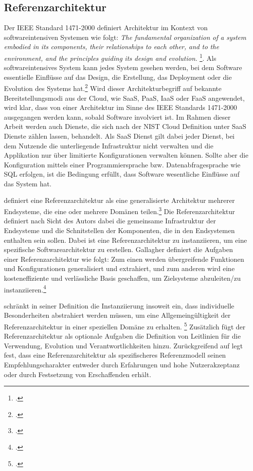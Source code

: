 \subsection{Referenzarchitektur}\label{subsection:Referenzarchitektu}
Der IEEE Standard 1471-2000 definiert Architektur im Kontext von softwareintensiven Systemen wie folgt:
\textit{The fundamental organization of a system embodied in its components, their relationships
to each other, and to the environment, and the principles guiding its design and evolution.} \footcite[][3]{IEEEComputerSociety.2000}. Als softwareintensives System kann jedes System gesehen werden, bei dem Software essentielle Einflüsse auf das Design, die Erstellung, das Deployment oder die Evolution des Systems hat.\footcite[Vgl.][1]{IEEEComputerSociety.2000}
Wird dieser Architekturbegriff auf bekannte Bereitstellungsmodi aus der Cloud, wie \ac{SaaS}, \ac{PaaS}, \ac{IaaS} oder \ac{FaaS} angewendet, wird klar, dass von einer Architektur im Sinne des IEEE Standards 1471-2000 ausgegangen werden kann, sobald Software involviert ist. Im Rahmen dieser Arbeit werden auch Dienste, die sich nach der NIST Cloud Definition unter \ac{SaaS} Dienste zählen lassen, behandelt. Als \ac{SaaS} Dienst gilt dabei jeder Dienst, bei dem Nutzende die unterliegende Infrastruktur nicht verwalten und die Applikation nur über limitierte Konfigurationen verwalten können. Sollte aber die Konfiguration mittels einer Programmiersprache bzw. Datenabfragesprache wie \ac{SQL} erfolgen, ist die Bedingung erfüllt, dass Software wesentliche Einflüsse auf das System hat.

\citeauthor{Gallagher.2000} definiert eine Referenzarchitektur als eine generalisierte Architektur mehrerer Endsysteme, die eine oder mehrere Domänen teilen.\footcite[Vgl. auch im Folgenden][3]{Gallagher.2000} Die Referenzarchitektur definiert nach Sicht des Autors dabei die gemeinsame Infrastruktur der Endsysteme und die Schnitstellen der Komponenten, die in den Endsystemen enthalten sein sollen. Dabei ist eine Referenzarchitektur zu instanziieren, um eine spezifische Softwarearchitektur zu erstellen. Gallagher definiert die Aufgaben einer Referenzarchitektur wie folgt: Zum einen werden übergreifende Funktionen und Konfigurationen generalisiert und extrahiert, und zum anderen wird eine kosteneffiziente und verlässliche Basis geschaffen, um Zielsysteme abzuleiten/zu instanziieren.\footcite[Vgl.][3]{Gallagher.2000}

\citeauthor{Trefke.2012} schränkt in seiner Definition die Instanziierung insoweit ein, dass individuelle Besonderheiten abstrahiert werden müssen, um eine Allgemeingültigkeit der Referenzarchitektur in einer speziellen Domäne zu erhalten.  \footcite[Vgl. auch im Folgenden][]{Trefke.2012} Zusätzlich fügt \citeauthor{Trefke.2012} der Referenzarchitektur als optionale Aufgaben die Definition von Leitlinien für die Verwendung, Evolution und Verantwortlichkeiten hinzu. Zurückgreifend auf \citeauthor{vomBrocke.2003} legt \citeauthor{Trefke.2012} fest, dass eine Referenzarchitektur als spezifischeres Referenzmodell seinen Empfehlungscharakter entweder durch Erfahrungen und hohe Nutzerakzeptanz oder durch Festsetzung von Erschaffenden erhält.

